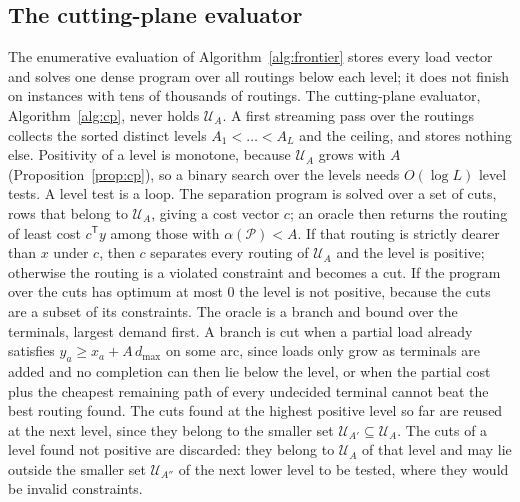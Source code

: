 \documentclass[11pt]{article}
\theoremstyle{remark}
\newcommand{\dmax}{d_{\max}}
\begin{document}
\subsection{The cutting-plane evaluator}
\label{sec:cp}

The enumerative evaluation of Algorithm~\ref{alg:frontier} stores every load vector and solves one dense program over all routings below each level; it does not finish
on instances with tens of thousands of routings. The cutting-plane evaluator, Algorithm~\ref{alg:cp}, never holds $\mathcal U_A$. A first streaming pass over the routings collects the sorted distinct
levels $A_1<\dots<A_L$ and the ceiling, and stores nothing else. Positivity of a level is monotone, because $\mathcal U_A$ grows with $A$
(Proposition~\ref{prop:cp}), so a binary search over the levels needs $O(\log L)$ level tests. A level test is a loop. The separation program is solved over a set of cuts, rows that belong to $\mathcal U_A$,
giving a cost vector $c$; an oracle then returns the routing of least cost $c^{\mathsf T}y$ among those with $\alpha(\mathcal P)<A$. If that routing is strictly dearer than $x$ under $c$, then $c$
separates every routing of $\mathcal U_A$ and the level is positive; otherwise the routing is a violated constraint and becomes a cut. If the program over the cuts has optimum at most $0$ the level is not positive,
because the cuts are a subset of its constraints. The oracle is a branch and bound over the terminals, largest demand first. A branch is cut when a partial load already satisfies
$y_a\ge x_a+A\,\dmax$ on some arc, since loads only grow as terminals are added and no completion can then lie below the level, or when the partial cost plus the cheapest remaining path of every undecided terminal
cannot beat the best routing found. The cuts found at the highest positive level so far are reused at the next level, since they belong to the smaller set $\mathcal U_{A'}\subseteq\mathcal U_A$. The cuts of a level found not positive are discarded: they belong to $\mathcal U_A$ of that level and may lie outside the smaller set $\mathcal U_{A''}$ of the next lower level to be tested, where they would be invalid constraints.
\end{document}
